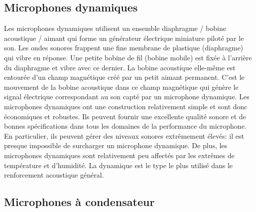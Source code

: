 \documentclass[a4paper, 12pt]{book}
\begin{document}
\subsection{Microphones dynamiques}

Les microphones dynamiques utilisent un ensemble diaphragme / bobine acoustique / aimant qui forme un générateur électrique miniature piloté par le son. Les ondes sonores frappent une fine membrane de plastique (diaphragme) qui vibre en réponse. Une petite bobine de fil (bobine mobile) est fixée à l'arrière du diaphragme et vibre avec ce dernier. La bobine acoustique elle-même est entourée d'un champ magnétique créé par un petit aimant permanent. C'est le mouvement de la bobine acoustique dans ce champ magnétique qui génère le signal électrique correspondant au son capté par un microphone dynamique. Les microphones dynamiques ont une construction relativement simple et sont donc économiques et robustes. Ils peuvent fournir une excellente qualité sonore et de bonnes spécifications dans tous les domaines de la performance du microphone. En particulier, ils peuvent gérer des niveaux sonores extrêmement élevés: il est presque impossible de surcharger un microphone dynamique. De plus, les microphones dynamiques sont relativement peu affectés par les extrêmes de température et d'humidité. La dynamique est le type le plus utilisé dans le renforcement acoustique général.


\subsection{Microphones à condensateur}
\end{document}
